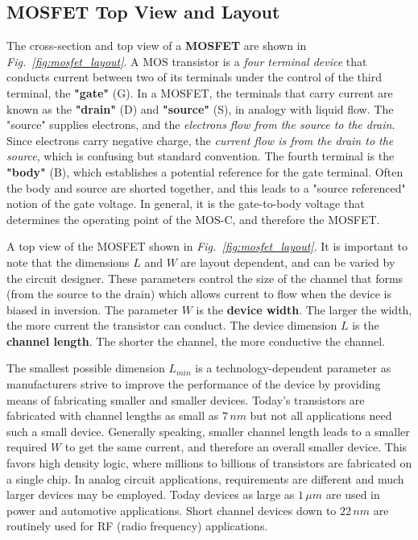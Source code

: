 \subsection{MOSFET Top View and Layout}
The cross-section and top view of a \textbf{MOSFET} are shown in \emph{Fig.~\ref{fig:mosfet_layout}}.  A MOS transistor is a \textit{four terminal device} that conducts current between two of its terminals under the control of the third terminal, the \textbf{"gate"} (G).  In a MOSFET, the terminals that carry current are known as the \textbf{"drain"} (D) and \textbf{"source"} (S), in analogy with liquid flow.  The "source" supplies electrons, and the \textit{electrons flow from the source to the drain}.  Since electrons carry negative charge, the \textit{current flow is from the drain to the source}, which is confusing but standard convention.  The fourth terminal is the \textbf{"body"} (B), which establishes a potential reference for the gate terminal.  Often the body and source are shorted together, and this leads to a "source referenced" notion of the gate voltage.  In general, it is the gate-to-body voltage that determines the operating point of the MOS-C, and therefore the MOSFET.

A top view of the MOSFET shown in \emph{Fig.~\ref{fig:mosfet_layout}}.  It is important to note that the dimensions $L$ and $W$ are layout dependent, and can be varied by the circuit designer.  These parameters control the size of the channel that forms (from the source to the drain) which allows current to flow when the device is biased in inversion.  The parameter $W$ is the \textbf{device width}.  The larger the width, the more current the transistor can conduct.  The device dimension $L$ is the \textbf{channel length}. The shorter the channel, the more conductive the channel.

The smallest possible dimension $L_{min}$ is a technology-dependent parameter as manufacturers strive to improve the performance of the device by providing means of fabricating smaller and smaller devices.  Today's transistors are fabricated with channel lengths as small as $7\,nm$ but not all applications need such a small device.  Generally speaking, smaller channel length leads to a smaller required $W$ to get the same current, and therefore an overall smaller device.  This favors high density logic, where millions to billions of transistors are fabricated on a single chip.  In analog circuit applications, requirements are different and much larger devices may be employed.  Today devices as large as $1\,\mu m$ are used in power and automotive applications.  Short channel devices down to $22\,nm$ are routinely used for RF (radio frequency) applications.

